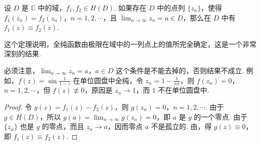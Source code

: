 \documentclass[../../main.tex]{subfiles}
\begin{document}
\begin{theorem}[唯一性定理]\label{theorem:定理4.3.7}
设 \( D \) 是 \( \mathbb{C} \) 中的域，\( f_1, f_2 \in H(D) \). 如果存在 \( D \) 中的点列 \( \{ z_n \} \)，使得 \( f_1(z_n) = f_2(z_n) \)，\( n = 1, 2, \cdots \)，且 \( \lim_{n \to \infty} z_n = a \in D \)，那么在 \( D \) 中有 \( f_1(z) \equiv f_2(z) \).
\end{theorem}
\begin{remark}
这个定理说明，全纯函数由极限在域中的一列点上的值所完全确定，这是一个非常深刻的结果.
\end{remark}
\begin{remark}
必须注意，\(\lim_{n \to \infty} z_n = a\)，\(a \in D\) 这个条件是不能去掉的，否则结果不成立. 例如，\(f(z) = \sin \frac{1}{1 - z}\) 在单位圆盘中全纯，令 \(z_n = 1 - \frac{1}{n\pi}\)，则 \(f(z_n) = 0\)，\(n = 1, 2, \cdots\)，但 \(f(z) \not\equiv 0\)，原因是 \(z_n \to 1\)，而 \(1\) 不在单位圆盘中.
\end{remark}
\begin{proof}
令 \( g(z) = f_1(z) - f_2(z) \)，则 \( g(z_n) = 0 \)，\( n = 1, 2, \cdots \). 由于 \( g \in H(D) \)，所以 \( g(a) = \lim_{n \to \infty} g(z_n) = 0 \)，即 \( a \) 是 \( g \) 的一个零点. 由于 \( \{ z_n \} \) 也是 \( g \) 的零点，而且 \( z_n \to a \)，因而零点 \( a \) 不是孤立的. 由，得 \( g(z) \equiv 0 \)，即 \( f_1(z) \equiv f_2(z) \).

\end{proof}
\end{document}
